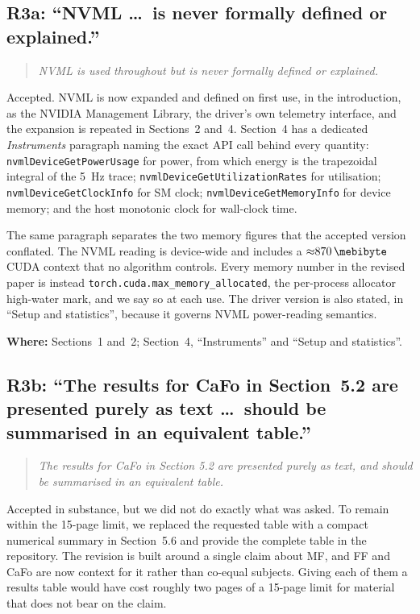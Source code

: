 \documentclass[11pt,a4paper]{article}
\newcommand{\tmma}{\texttt{torch.cuda.\allowbreak max\_memory\_\allowbreak allocated}}
\newcommand{\FF}{FF}
\newcommand{\MF}{MF}
\newcommand{\CaFo}{CaFo}
\newenvironment{comment}%
  {\begin{quote}\itshape\small}%
  {\end{quote}}
\newcommand{\where}[1]{\par\smallskip\noindent\textbf{Where:} #1\par}
\begin{document}
\subsection*{R3a: ``NVML \dots\ is never formally defined or explained.''}

\begin{comment}
NVML is used throughout but is never formally defined or explained.
\end{comment}

\noindent
Accepted. NVML is now expanded and defined on first use, in the introduction, as the
NVIDIA Management Library, the driver's own telemetry
interface, and the expansion is repeated in Sections~2 and~4. Section~4 has a dedicated \emph{Instruments} paragraph naming the
exact API call behind every quantity: \texttt{nvmlDeviceGetPowerUsage} for
power, from which energy is the trapezoidal integral of the \SI{5}{\hertz}
trace; \texttt{nvmlDeviceGetUtilizationRates} for utilisation;
\texttt{nvmlDeviceGetClockInfo} for SM clock;
\texttt{nvmlDeviceGetMemoryInfo} for device memory; and the host monotonic
clock for wall-clock time.

The same paragraph separates the two memory figures that the accepted version
conflated. The NVML reading is device-wide and includes a
${\approx}\SI{870}{\mebibyte}$ CUDA context that no algorithm controls. Every
memory number in the revised paper is instead \tmma{}, the per-process
allocator high-water mark, and we say so at each use. The driver version is
also stated, in ``Setup and statistics'', because it governs NVML
power-reading semantics.

\where{Sections~1 and~2; Section~4, ``Instruments'' and ``Setup and statistics''.}

\subsection*{R3b: ``The results for CaFo in Section~5.2 are presented purely
as text \dots\ should be summarised in an equivalent table.''}

\begin{comment}
The results for CaFo in Section 5.2 are presented purely as text, and should be
summarised in an equivalent table.
\end{comment}

\noindent
Accepted in substance, but we did not do exactly what was asked. To remain
within the \num{15}-page limit, we replaced the requested table with a compact
numerical summary in Section~5.6 and provide the complete table in the
repository. The revision is built around a single claim about \MF{},
and \FF{} and \CaFo{} are now context for it rather than co-equal subjects.
Giving each of them a results table would have cost roughly two pages of a
\num{15}-page limit for material that does not bear on the claim.
\end{document}

